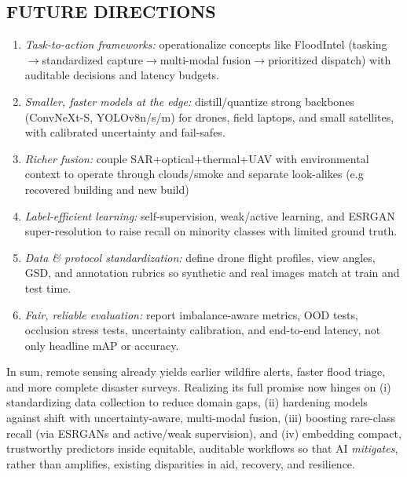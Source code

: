 \documentclass[conference,a4paper]{IEEEtran}
\begin{document}
\subsection{FUTURE DIRECTIONS}
\begin{enumerate}
  \item \textit{Task-to-action frameworks:} operationalize concepts like FloodIntel (tasking$\rightarrow$standardized capture$\rightarrow$multi-modal fusion$\rightarrow$prioritized dispatch) with auditable decisions and latency budgets.
  \item \textit{Smaller, faster models at the edge:} distill/quantize strong backbones (ConvNeXt-S, YOLOv8n/s/m) for drones, field laptops, and small satellites, with calibrated uncertainty and fail-safes.
  \item \textit{Richer fusion:} couple SAR+optical+thermal+UAV with environmental context to operate through clouds/smoke and separate look-alikes (e.g recovered building and new build)
  \item \textit{Label-efficient learning:} self-supervision, weak/active learning, and ESRGAN super-resolution to raise recall on minority classes with limited ground truth.
  \item \textit{Data \& protocol standardization:} define drone flight profiles, view angles, GSD, and annotation rubrics so synthetic and real images match at train and test time.
  \item \textit{Fair, reliable evaluation:} report imbalance-aware metrics, OOD tests, occlusion stress tests, uncertainty calibration, and end-to-end latency, not only headline mAP or accuracy.
\end{enumerate}


In sum, remote sensing already yields earlier wildfire alerts, faster flood triage, and more complete disaster surveys. Realizing its full promise now hinges on (i) standardizing data collection to reduce domain gaps, (ii) hardening models against shift with uncertainty-aware, multi-modal fusion, (iii) boosting rare-class recall (via ESRGANs and active/weak supervision), and (iv) embedding compact, trustworthy predictors inside equitable, auditable workflows so that AI \emph{mitigates}, rather than amplifies, existing disparities in aid, recovery, and resilience.




  
\end{document}
